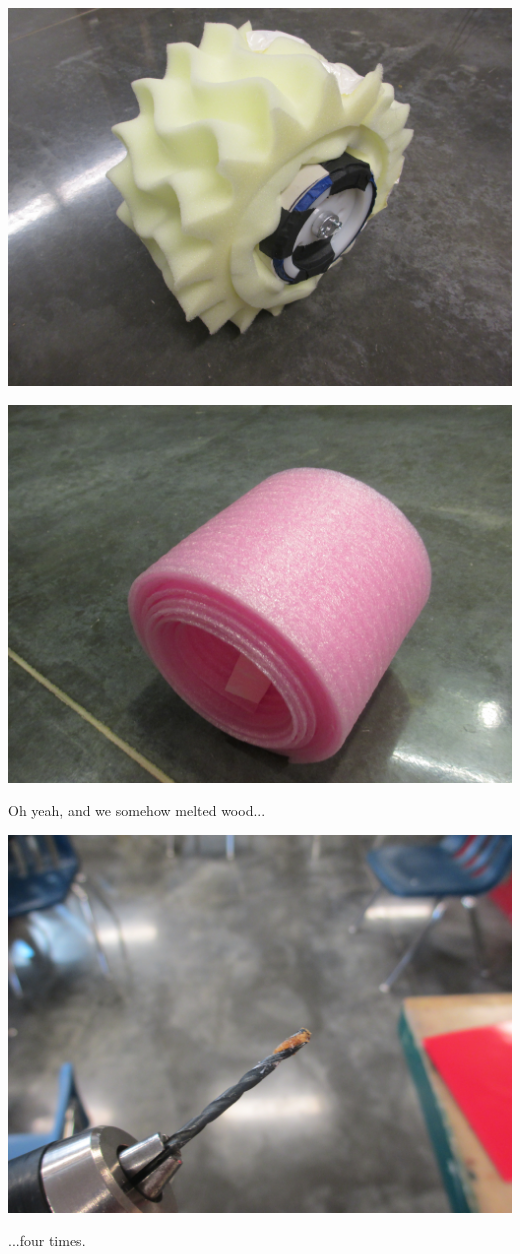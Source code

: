 \begin{center}
 \includegraphics[width=\textwidth]{./Entries/Images/launchProto2.JPG}
\end{center}

\begin{center}
 \includegraphics[width=\textwidth]{./Entries/Images/launchProto12.JPG}
\end{center}


Oh yeah, and we somehow melted wood...

\begin{center}
 \includegraphics[width=\textwidth]{./Entries/Images/meltedWood.JPG}
\end{center}

...four times.